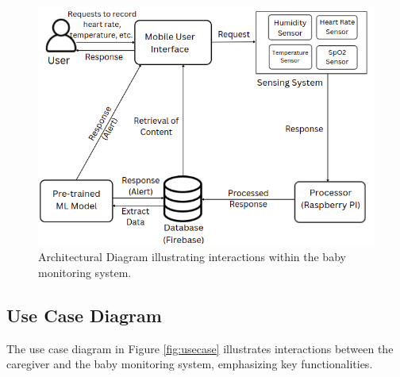 \documentclass[12pt,a4paper]{report}
\begin{document}
\begin{figure}[hbtp]
  \centering
  \includegraphics[scale=0.6]{./pic/architecture.png}
  \caption{Architectural Diagram illustrating interactions within the baby monitoring system.}
  \label{fig:architecture}
\end{figure}

\subsection{Use Case Diagram}
The use case diagram in Figure \ref{fig:usecase} illustrates interactions between the caregiver and the baby monitoring system, emphasizing key functionalities.
\end{document}
